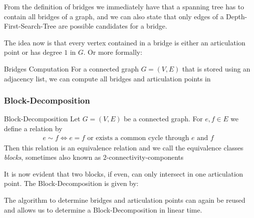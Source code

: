 \begin{center}
\end{center}

From the definition of bridges we immediately have that a spanning tree has to contain all bridges of a graph, and we can also state that only edges of a Depth-First-Search-Tree are possible candidates for a bridge.

The idea now is that every vertex contained in a bridge is either an articulation point or has degree $1$ in $G$. Or more formally:

\begin{center}
\end{center}

\begin{theorem}[]{Bridges Computation}
    For a connected graph $G = (V, E)$ that is stored using an adjacency list, we can compute all bridges and articulation points in 
\end{theorem}

\subsubsection{Block-Decomposition}
\begin{definition}[]{Block-Decomposition}
    Let $G = (V, E)$ be a connected graph. For $e, f \in E$ we define a relation by
    \begin{align*}
        e \sim f \Longleftrightarrow e = f \text{ or exists a common cycle through $e$ and } f
    \end{align*}
    Then this relation is an equivalence relation and we call the equivalence classes \textit{blocks}, sometimes also known as $2$-connectivity-components
\end{definition}
It is now evident that two blocks, if even, can only intersect in one articulation point.
The Block-Decomposition is given by:
\begin{center}
\end{center}
The algorithm to determine bridges and articulation points can again be reused and allows us to determine a Block-Decomposition in linear time.



